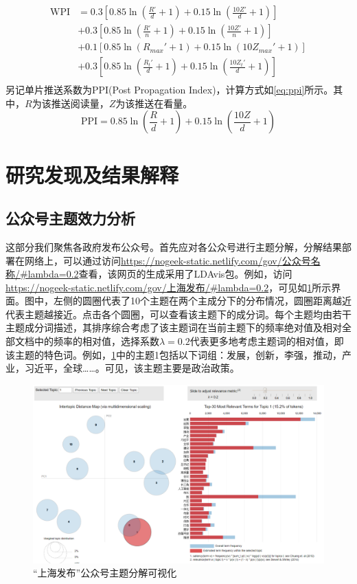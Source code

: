 \documentclass[a4paper,12pt,UTF8]{article}
\begin{document}
    \begin{equation}
      \label{eq:wpi}
      \begin{aligned}
        \text{WPI} &= 0.3\left[0.85 \ln (\frac{R'}{d} + 1)+ 0.15 \ln (\frac{10Z'}{d} + 1)\right] \\
                   &+ 0.3\left[0.85 \ln (\frac{R'}{n} + 1)+ 0.15 \ln (\frac{10Z'}{n} + 1)\right] \\
                   &+ 0.1\left[0.85 \ln (R_{max}' + 1)+ 0.15 \ln (10Z_{max}' + 1)\right] \\
                   &+ 0.3\left[0.85 \ln (\frac{R_t'}{d} + 1)+ 0.15 \ln (\frac{10Z_t'}{d} + 1)\right] \\
      \end{aligned}
    \end{equation}
    另记单片推送系数为PPI(Post Propagation Index)，计算方式如\cref{eq:ppi}所示。其中，$R$为该推送阅读量，$Z$为该推送在看量。
    \begin{equation}
      \label{eq:ppi}
      \text{PPI} = 0.85 \ln (\frac{R}{d} + 1)+ 0.15 \ln (\frac{10Z}{d} + 1)
    \end{equation}
    \section{研究发现及结果解释}
    \subsection{公众号主题效力分析}
    这部分我们聚焦各政府发布公众号。首先应对各公众号进行主题分解，分解结果部署在网络上，可以通过访问\url{https://nogeek-static.netlify.com/gov/公众号名称/#lambda=0.2}查看，该网页的生成采用了LDAvis包\cite{sievert2014ldavis}。例如，访问\url{https://nogeek-static.netlify.com/gov/上海发布/#lambda=0.2}，可见如\cref{fig:shanghai-vis}所示界面。图中，左侧的圆圈代表了10个主题在两个主成分下的分布情况，圆圈距离越近代表主题越接近。点击各个圆圈，可以查看该主题下的成分词。每个主题均由若干主题成分词描述，其排序综合考虑了该主题词在当前主题下的频率绝对值及相对全部文档中的频率的相对值，选择系数$\lambda=0.2$代表更多地考虑主题词的相对值，即该主题的特色词。例如，\cref{fig:shanghai-vis}中的主题1包括以下词组：发展，创新，李强，推动，产业，习近平，全球……。可见，该主题主要是政治政策。
  
    \begin{figure}
      \centering
      \includegraphics[width=0.9\linewidth]{shanghai-vis.png}
      \caption{“上海发布”公众号主题分解可视化}
      \label{fig:shanghai-vis}
    \end{figure}
\end{document}
